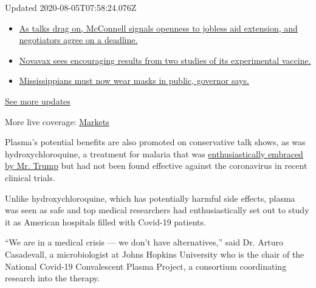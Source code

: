 Updated 2020-08-05T07:58:24.076Z

\begin{itemize}
\tightlist
\item
  \href{https://www.nytimes3xbfgragh.onion/2020/08/04/world/coronavirus-cases.html?action=click\&pgtype=Article\&state=default\&region=MAIN_CONTENT_1\&context=storylines_live_updates\#link-762df92}{As
  talks drag on, McConnell signals openness to jobless aid extension,
  and negotiators agree on a deadline.}
\item
  \href{https://www.nytimes3xbfgragh.onion/2020/08/04/world/coronavirus-cases.html?action=click\&pgtype=Article\&state=default\&region=MAIN_CONTENT_1\&context=storylines_live_updates\#link-1228a480}{Novavax
  sees encouraging results from two studies of its experimental
  vaccine.}
\item
  \href{https://www.nytimes3xbfgragh.onion/2020/08/04/world/coronavirus-cases.html?action=click\&pgtype=Article\&state=default\&region=MAIN_CONTENT_1\&context=storylines_live_updates\#link-794484ed}{Mississippians
  must now wear masks in public, governor says.}
\end{itemize}

\href{https://www.nytimes3xbfgragh.onion/2020/08/04/world/coronavirus-cases.html?action=click\&pgtype=Article\&state=default\&region=MAIN_CONTENT_1\&context=storylines_live_updates}{See
more updates}

More live coverage:
\href{https://www.nytimes3xbfgragh.onion/live/2020/08/04/business/stock-market-today-coronavirus?action=click\&pgtype=Article\&state=default\&region=MAIN_CONTENT_1\&context=storylines_live_updates}{Markets}

Plasma's potential benefits are also promoted on conservative talk
shows, as was hydroxychloroquine, a treatment for malaria that was
\href{https://www.nytimes3xbfgragh.onion/2020/03/20/health/coronavirus-chloroquine-trump.html}{enthusiastically
embraced by Mr. Trump} but had not been found effective against the
coronavirus in recent clinical trials.

Unlike hydroxychloroquine, which has potentially harmful side effects,
plasma was seen as safe and top medical researchers had enthusiastically
set out to study it as American hospitals filled with Covid-19 patients.

``We are in a medical crisis --- we don't have alternatives,'' said Dr.
Arturo Casadevall, a microbiologist at Johns Hopkins University who is
the chair of the National Covid-19 Convalescent Plasma Project, a
consortium coordinating research into the therapy.

